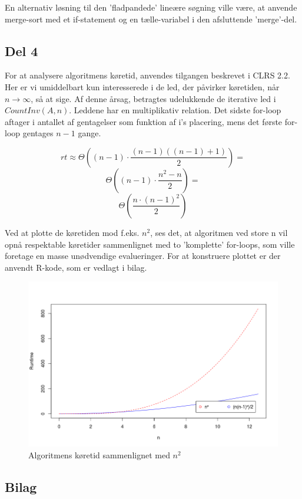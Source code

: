 \documentclass[a4paper,10pt]{article}
\begin{document}
En alternativ løsning til den 'fladpandede' lineære søgning ville være, at anvende merge-sort med et if-statement og en tælle-variabel i den afsluttende 'merge'-del.

\subsection*{Del 4}

For at analysere algoritmens køretid, anvendes tilgangen beskrevet i CLRS 2.2. Her er vi umiddelbart kun interesserede i de led, der påvirker køretiden, når $n\rightarrow \infty$, så at sige. Af denne årsag, betragtes udelukkende de iterative led i $CountInv(A,n)$. Leddene har en multiplikativ relation. Det sidste for-loop aftager i  antallet af gentagelser som funktion af i's placering, mens det første for-loop gentages $n-1$ gange.

$$
rt \approx \Theta((n-1)\cdot\frac{(n-1)((n-1)+1)}{2}) =
$$
$$
\Theta((n-1)\cdot\frac{n^{2}- n}{2}) =
$$
$$
\Theta(\frac{n\cdot(n-1)^{2}}{2})
$$

Ved at plotte de køretiden mod f.eks. $n^{2}$, ses det, at algoritmen ved store n vil opnå respektable køretider sammenlignet med to 'komplette' for-loops, som ville foretage en masse unødvendige evalueringer. For at konstruere plottet er der anvendt R-kode, som er vedlagt i bilag.

\begin{figure}[H]
\centering
\includegraphics[scale = 0.3]{Runtime2.png}
\caption{Algoritmens køretid sammenlignet med $n^{2}$}
\end{figure}

\subsection*{Bilag}
\end{document}
